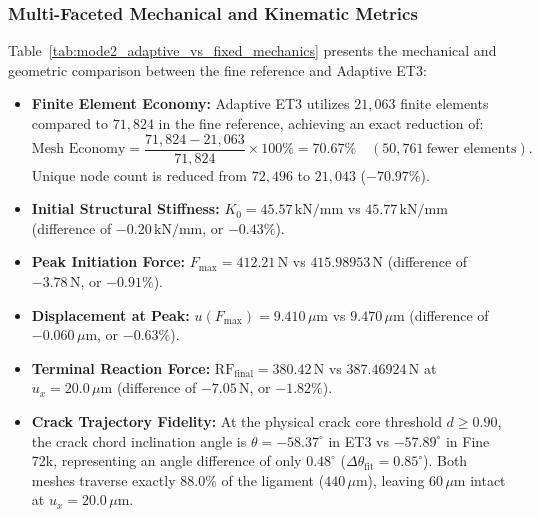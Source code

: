\subsubsection{Multi-Faceted Mechanical and Kinematic Metrics}
Table~\ref{tab:mode2_adaptive_vs_fixed_mechanics} presents the mechanical and geometric comparison between the fine reference and Adaptive ET3:
\begin{itemize}
  \item \textbf{Finite Element Economy:} Adaptive ET3 utilizes $21{,}063$ finite elements compared to $71{,}824$ in the fine reference, achieving an exact reduction of:
  \begin{equation}
    \text{Mesh Economy} = \frac{71{,}824 - 21{,}063}{71{,}824} \times 100\% = \mathbf{70.67\%} \quad (50{,}761\ \text{fewer elements}).
    \label{eq:fe_reduction}
  \end{equation}
  Unique node count is reduced from $72{,}496$ to $21{,}043$ ($-70.97\%$).
  \item \textbf{Initial Structural Stiffness:} $K_0 = 45.57\,\mathrm{kN/mm}$ vs $45.77\,\mathrm{kN/mm}$ (difference of $-0.20\,\mathrm{kN/mm}$, or \textbf{$-0.43\%$}).
  \item \textbf{Peak Initiation Force:} $F_{\max} = 412.21\,\mathrm{N}$ vs $415.98953\,\mathrm{N}$ (difference of $-3.78\,\mathrm{N}$, or \textbf{$-0.91\%$}).
  \item \textbf{Displacement at Peak:} $u(F_{\max}) = 9.410\,\mu\mathrm{m}$ vs $9.470\,\mu\mathrm{m}$ (difference of $-0.060\,\mu\mathrm{m}$, or \textbf{$-0.63\%$}).
  \item \textbf{Terminal Reaction Force:} $\mathrm{RF}_{\mathrm{final}} = 380.42\,\mathrm{N}$ vs $387.46924\,\mathrm{N}$ at $u_x = 20.0\,\mu\mathrm{m}$ (difference of $-7.05\,\mathrm{N}$, or \textbf{$-1.82\%$}).
  \item \textbf{Crack Trajectory Fidelity:} At the physical crack core threshold $d \ge 0.90$, the crack chord inclination angle is $\theta = -58.37^\circ$ in ET3 vs $-57.89^\circ$ in Fine 72k, representing an angle difference of only \textbf{$0.48^\circ$} ($\Delta \theta_{\mathrm{fit}} = 0.85^\circ$). Both meshes traverse exactly $88.0\%$ of the ligament ($440\,\mu\mathrm{m}$), leaving $60\,\mu\mathrm{m}$ intact at $u_x = 20.0\,\mu\mathrm{m}$.
\end{itemize}

